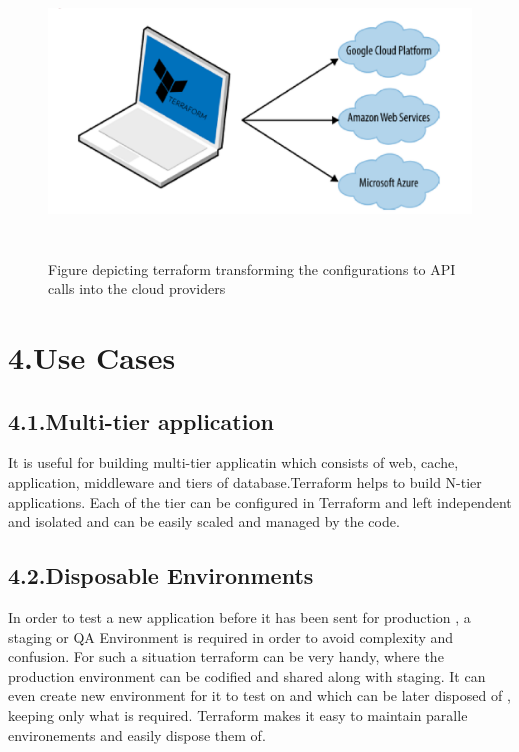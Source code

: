 \documentclass[9pt,twocolumn,twoside]{../../styles/osajnl}
\begin{document}
\begin{figure}[h]
  \begin{center}
\includegraphics[width=\linewidth,height=3in]{images/terraform_1}
\caption{Figure depicting terraform transforming the configurations to
  API calls into the cloud providers \cite{www-terraform-book}}
\label{fig:work}
\end{center}
\end{figure}

\section{4.Use Cases}

\subsection{4.1.Multi-tier application}

It is useful for building multi-tier applicatin which consists of web,
cache, application, middleware and tiers of database.Terraform helps
to build N-tier applications. Each of the tier can be configured in
Terraform and left independent and isolated and can be easily scaled
and managed by the code\cite{www-terraform-book}.


\subsection{4.2.Disposable Environments}

In order to test a new application before it has been sent for
production , a staging or QA Environment is required in order to avoid
complexity and confusion. For such a situation terraform can be very
handy, where the production environment can be codified and shared
along with staging. It can even create new environment for it to test
on and which can be later disposed of , keeping only what is
required. Terraform makes it easy to maintain paralle environements
and easily dispose them of\cite{www-terraform-book}.
\end{document}

